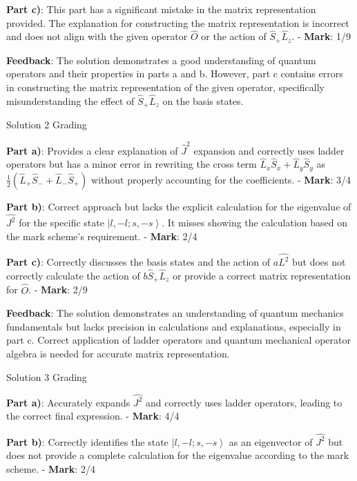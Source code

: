 \documentclass[a4paper,11pt]{article}
\begin{document}
\textbf{Part c)}: This part has a significant mistake in the matrix representation provided. The explanation for constructing the matrix representation is incorrect and does not align with the given operator \( \hat{O} \) or the action of \( \hat{S}_{+}\hat{L}_{z} \).
- \textbf{Mark}: 1/9

\textbf{Feedback}: The solution demonstrates a good understanding of quantum operators and their properties in parts a and b. However, part c contains errors in constructing the matrix representation of the given operator, specifically misunderstanding the effect of \( \hat{S}_{+}\hat{L}_{z} \) on the basis states.

Solution 2 Grading

\textbf{Part a)}: Provides a clear explanation of \( \hat{J}^2 \) expansion and correctly uses ladder operators but has a minor error in rewriting the cross term \( \hat{L}_{x}\hat{S}_{x} + \hat{L}_{y}\hat{S}_{y} \) as \( \frac{1}{2}(\hat{L}_{+}\hat{S}_{-} + \hat{L}_{-}\hat{S}_{+}) \) without properly accounting for the coefficients.
- \textbf{Mark}: 3/4

\textbf{Part b)}: Correct approach but lacks the explicit calculation for the eigenvalue of \( \hat{J^2} \) for the specific state \( \left|l, -l; s, -s \right> \). It misses showing the calculation based on the mark scheme's requirement.
- \textbf{Mark}: 2/4

\textbf{Part c)}: Correctly discusses the basis states and the action of \( a\hat{L^2} \) but does not correctly calculate the action of \( b\hat{S}_{+}\hat{L}_{z} \) or provide a correct matrix representation for \( \hat{O} \).
- \textbf{Mark}: 2/9

\textbf{Feedback}: The solution demonstrates an understanding of quantum mechanics fundamentals but lacks precision in calculations and explanations, especially in part c. Correct application of ladder operators and quantum mechanical operator algebra is needed for accurate matrix representation.

Solution 3 Grading

\textbf{Part a)}: Accurately expands \( \hat{J^2} \) and correctly uses ladder operators, leading to the correct final expression.
- \textbf{Mark}: 4/4

\textbf{Part b)}: Correctly identifies the state \( \left|l, -l; s, -s \right> \) as an eigenvector of \( \hat{J^2} \) but does not provide a complete calculation for the eigenvalue according to the mark scheme.
- \textbf{Mark}: 2/4
\end{document}
